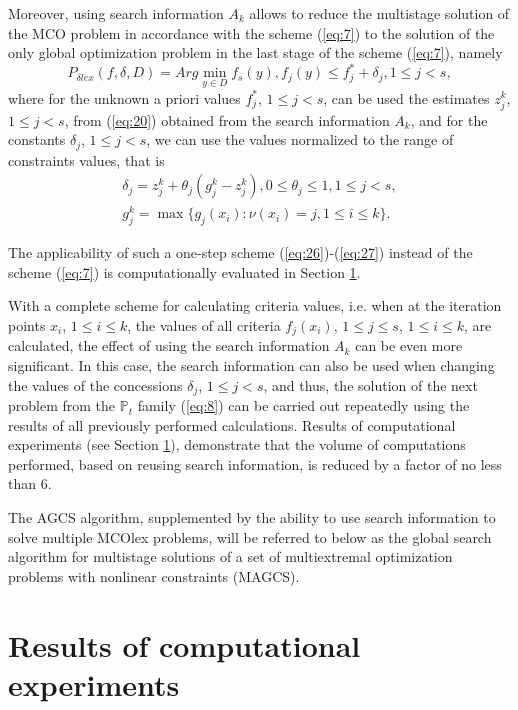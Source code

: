 \documentclass[smallextended]{svjour3}       %
\begin{document}
Moreover, using search information $A_k$ allows to reduce the multistage solution of the MCO problem in accordance with the scheme (\ref{eq:7}) to the solution of the only global optimization problem in the last stage of the scheme (\ref{eq:7}), namely 
\begin{equation}\label{eq:26}
P_{\delta lex} (f,\delta,D)=Arg \min_{y\in D}{f_s(y)}, f_j(y)\leq f_j^*+\delta_j, 1 \leq j < s,
\end{equation}
where for the unknown a priori values $f_j^*$, $1 \leq j < s$, can be used the estimates $z_j^k$, $1 \leq j < s$, from (\ref{eq:20}) obtained from the search information $A_k$,  and for the constants $\delta_j$, $1 \leq j<s$, we can use the values normalized to the range of constraints values, that is
\begin{equation}\label{eq:27}
	\begin{matrix}
	\delta_j=z_j^k+\theta_j (g_j^k-z_j^k ), 0\leq \theta_j\leq 1,1\leq j < s,\\
	g_j^k= \max{\{ g_j (x_i ) : \nu(x_i)=j,1\leq i\leq k \}}.
	\end{matrix}
\end{equation}

The applicability of such a one-step scheme (\ref{eq:26})-(\ref{eq:27}) instead of the scheme (\ref{eq:7}) is computationally evaluated in Section \ref{sec:4}.

With a complete scheme for calculating criteria values, i.e. when at the iteration points $x_i$, $1 \leq i \leq k$,  the values of all criteria $f_j (x_i)$, $1 \leq j \leq s$, $1 \leq i \leq k$, are calculated, the effect of using the search information $A_k$ can be even more significant. In this case, the search information can also be used when changing the values of the concessions $\delta_j$, $1 \leq j < s$, and thus, the solution of the next problem from the $\mathbb{P}_t$ family (\ref{eq:8}) can be carried out repeatedly using the results of all previously performed calculations. Results of computational experiments (see Section \ref{sec:4}), demonstrate that the volume of computations performed, based on reusing search information, is reduced by a factor of no less than 6.

The AGCS algorithm, supplemented by the ability to use search information to solve multiple MCOlex  problems, will be referred to below as the global search algorithm for multistage solutions of a set of multiextremal optimization problems with nonlinear constraints (MAGCS).

\section{Results of computational experiments}
\label{sec:4}
\end{document}
